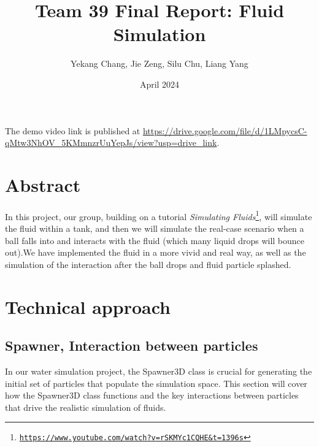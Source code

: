 \documentclass{article}
\title{Team 39 Final Report: Fluid Simulation}
\author{Yekang Chang, Jie Zeng, Silu Chu, Liang Yang}
\date{April 2024}
\newcommand\foothref[3]{#1\footnote{\href{#2}{#3}}}
\begin{document}
\maketitle

The demo video link is published at \url{https://drive.google.com/file/d/1LMpycsC-qMtw3NhOV_5KMmnzrUuYepJs/view?usp=drive_link}.

\section{Abstract}


\hspace{1em} In this project, our group, building on a tutorial \foothref{\textit{Simulating Fluids}}{https://www.youtube.com/watch?v=rSKMYc1CQHE&t=1396s}{\texttt{https://www.youtube.com/watch?v=rSKMYc1CQHE\&t=1396s}},
  will simulate the fluid within a tank, and then we will simulate the real-case scenario when a ball falls into and interacts with the fluid (which many liquid drops will bounce out).We have implemented the fluid in a more vivid and real way, as well as the simulation of the interaction after the ball drops and fluid particle splashed. 

\section{Technical approach}

\subsection{Spawner, Interaction between particles}
 \hspace{1em} In our water simulation project, the Spawner3D class is crucial for generating the initial set of particles that populate the simulation space. This section will cover how the Spawner3D class functions and the key interactions between particles that drive the realistic simulation of fluids.
\end{document}
